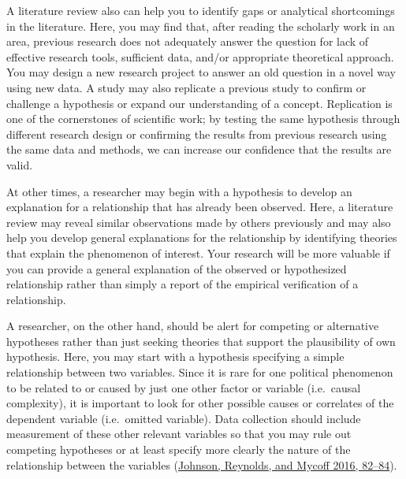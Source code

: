 \documentclass{book}
\begin{document}
A literature review also can help you to identify gaps or analytical
shortcomings in the literature. Here, you may find that, after reading the
scholarly work in an area, previous research does not adequately answer the
question for lack of effective research tools, sufficient data, and/or
appropriate theoretical approach. You may design a new research project to
answer an old question in a novel way using new data. A study may also
replicate a previous study to confirm or challenge a hypothesis or expand our
understanding of a concept. Replication is one of the cornerstones of
scientific work; by testing the same hypothesis through different research
design or confirming the results from previous research using the same data
and methods, we can increase our confidence that the results are valid.

At other times, a researcher may begin with a hypothesis to develop an
explanation for a relationship that has already been observed. Here, a
literature review may reveal similar observations made by others previously
and may also help you develop general explanations for the relationship by
identifying theories that explain the phenomenon of interest. Your research
will be more valuable if you can provide a general explanation of the observed
or hypothesized relationship rather than simply a report of the empirical
verification of a relationship.

A researcher, on the other hand, should be alert for competing or alternative
hypotheses rather than just seeking theories that support the plausibility of
own hypothesis. Here, you may start with a hypothesis specifying a simple
relationship between two variables. Since it is rare for one political
phenomenon to be related to or caused by just one other factor or variable
(i.e.~causal complexity), it is important to look for other possible causes or
correlates of the dependent variable (i.e.~omitted variable). Data collection
should include measurement of these other relevant variables so that you may
rule out competing hypotheses or at least specify more clearly the nature of
the relationship between the variables
(\protect\hyperlink{ref-johnsonPoliticalScienceResearch2016}{Johnson,
Reynolds, and Mycoff 2016, 82--84}).
\end{document}
